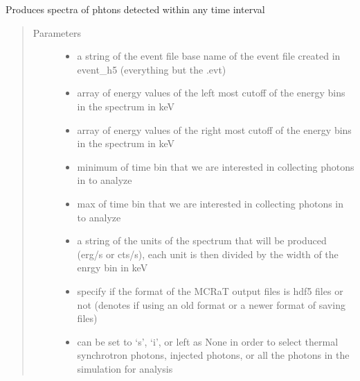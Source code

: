 \documentclass[letterpaper,10pt,english]{sphinxmanual}
\begin{document}
\begin{fulllineitems}
\label{\detokenize{mclib:mclib.spex}}
Produces spectra of phtons detected within any time interval
\begin{quote}\begin{description}
\item[{Parameters}] \leavevmode\begin{itemize}
\item {} 
 \textendash{} a string of the event file base name of the event file created in event\_h5 (everything but the .evt)

\item {} 
 \textendash{} array of energy values of the left most cutoff of the energy bins in the spectrum in keV

\item {} 
 \textendash{} array of energy values of the right most cutoff of the energy bins in the spectrum in keV

\item {} 
 \textendash{} minimum of time bin that we are interested in collecting photons in to analyze

\item {} 
 \textendash{} max of time bin that we are interested in collecting photons in to analyze

\item {} 
 \textendash{} a string of the units of the spectrum that will be produced (erg/s or cts/s), each unit is then divided by the width of the enrgy bin in keV

\item {} 
 \textendash{} specify if the format of the MCRaT output files is hdf5 files or not (denotes if using an old format or
a newer format of saving files)

\item {} 
 \textendash{} can be set to ‘s’, ‘i’, or left as None in order to select thermal synchrotron photons, injected photons, or all the photons in the simulation for analysis


\end{itemize}
\end{description}
\end{quote}
\end{fulllineitems}
\end{document}
